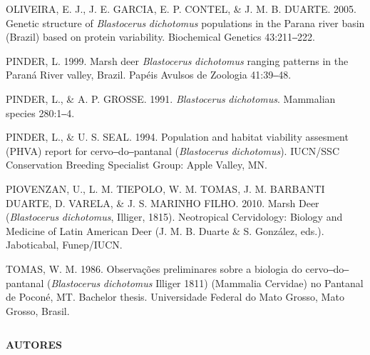 \documentclass[
  x11names]{article}
\begin{document}
OLIVEIRA, E. J., J. E. GARCIA, E. P. CONTEL, \& J. M. B. DUARTE. 2005.
Genetic structure of \textit{Blastocerus} \textit{dichotomus}
populations in the Parana river basin (Brazil) based on protein
variability. Biochemical Genetics 43:211‒222.

PINDER, L. 1999. Marsh deer \textit{Blastocerus} \textit{dichotomus}
ranging patterns in the Paraná River valley, Brazil. Papéis Avulsos de
Zoologia 41:39‒48.

PINDER, L., \& A. P. GROSSE. 1991. \textit{Blastocerus}
\textit{dichotomus}. Mammalian species 280:1‒4.

PINDER, L., \& U. S. SEAL. 1994. Population and habitat viability
assesment (PHVA) report for cervo‒do‒pantanal (\textit{Blastocerus}
\textit{dichotomus}). IUCN/SSC Conservation Breeding Specialist Group:
Apple Valley, MN.~

PIOVENZAN, U., L. M. TIEPOLO, W. M. TOMAS, J. M. BARBANTI DUARTE, D.
VARELA, \& J. S. MARINHO FILHO. 2010. Marsh Deer (\textit{Blastocerus}
\textit{dichotomus}, Illiger, 1815). Neotropical Cervidology: Biology
and Medicine of Latin American Deer (J. M. B. Duarte \& S. González,
eds.). Jaboticabal, Funep/IUCN.

TOMAS, W. M. 1986. Observações preliminares sobre a biologia do
cervo‒do‒pantanal (\textit{Blastocerus} \textit{dichotomus} Illiger
1811) (Mammalia Cervidae) no Pantanal de Poconé, MT. Bachelor thesis.
Universidade Federal do Mato Grosso, Mato Grosso, Brasil.

\setlength{\parindent}{0pt}

%
\begin{table}[H]
\centering
\begin{tabular}[t]{>{\raggedright\arraybackslash}m{16cm}>{}m{16cm}}
\toprule
\cellcolor{ceil}{\textcolor{white}{\textbf{\rule{0pt}{14pt}AUTORES}}}\\
\bottomrule
\end{tabular}
\end{table}

\textbf{AUTORES}
\end{document}
